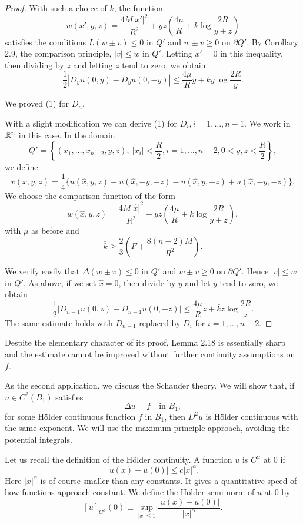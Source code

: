 \begin{proof}
With such a choice of $k$, the function
\[
w(x',y,z)=\frac{4M|x'|^2}{R^2}+yz\left(\frac{4\mu}{R}+k\log\frac{2R}{y+z}\right)
\]
satisfies the conditions $L(w\pm v)\leq 0$ in $Q'$ and $w\pm v\geq 0$ on $\partial Q'$. By Corollary 2.9, the comparison principle, $|v|\leq w$ in $Q'$. Letting $x'=0$ in this inequality, then dividing by $z$ and letting $z$ tend to zero, we obtain
\[
\frac{1}{2}|D_yu(0,y)-D_yu(0,-y)|\leq \frac{4\mu}{R}y+ky\log\frac{2R}{y}.
\]

We proved (1) for $D_n$.

With a slight modification we can derive (1) for $D_i, i=1,\ldots,n-1$. We work in $\mathbb{R}^n$ in this case. In the domain
\[
Q'=\left\{(x_1,\ldots,x_{n-2},y,z);\ |x_i|<\frac{R}{2}, i=1,\ldots,n-2, 0<y,z<\frac{R}{2}\right\},
\]
we define
\[
v(\hat{x},y,z)=\frac{1}{4}\{u(\hat{x},y,z)-u(\hat{x},-y,-z)-u(\hat{x},y,-z)+u(\hat{x},-y,-z)\}.
\]
We choose the comparison function of the form
\[
w(\hat{x}, y, z)
= \frac{4M|\hat{x}|^2}{R^2}
  + yz\left(\frac{4\mu}{R} + \bar{k}\log\frac{2R}{y+z}\right),
\]
with $\mu$ as before and
\[
\bar{k} \ge \frac{2}{3}\left(F + \frac{8(n-2)M}{R^2}\right).
\]

We verify easily that $\Delta(w \pm v) \le 0$ in $Q'$ and $w \pm v \ge 0$ on $\partial Q'$. Hence $|v| \le w$ in $Q'$. As above, if we set $\hat{x} = 0$, then divide by $y$ and let $y$ tend to zero, we obtain
\[
\frac{1}{2}\bigl|D_{n-1}u(0,z) - D_{n-1}u(0,-z)\bigr|
\le \frac{4\mu}{R} z + \bar{k}z\log\frac{2R}{z}.
\]
The same estimate holds with $D_{n-1}$ replaced by $D_i$ for
$i=1,\ldots,n-2$.
\end{proof}

Despite the elementary character of its proof, Lemma 2.18 is essentially sharp and the estimate cannot be improved without further continuity assumptions on $f$.

As the second application, we discuss the Schauder theory. We will show that, if $u \in C^2(B_1)$ satisfies
\[
\Delta u = f \quad \text{in } B_1,
\]
for some Hölder continuous function $f$ in $B_1$, then $D^2u$ is Hölder continuous with the same exponent. We will use the maximum principle approach, avoiding the potential integrals.

Let us recall the definition of the Hölder continuity. A function $u$ is $C^\alpha$ at $0$ if
\[
|u(x) - u(0)| \le c|x|^\alpha.
\]
Here $|x|^\alpha$ is of course smaller than any constants. It gives a quantitative speed of how functions approach constant. We define the Hölder semi-norm of $u$ at $0$ by
\[
[u]_{C^\alpha}(0) \equiv \sup_{|x|\le 1}\frac{|u(x) - u(0)|}{|x|^\alpha}.
\]

